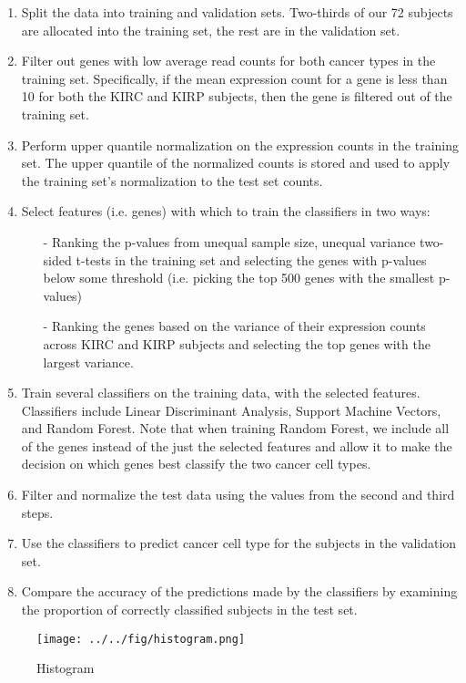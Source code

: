 \begin{enumerate}
\item Split the data into training and validation sets. Two-thirds of our 72 subjects are allocated into the training set,
the rest are in the validation set.
\item Filter out genes with low average read counts for both cancer types in the training set. Specifically, if the 
mean expression count for a gene is less than 10 for both the KIRC and KIRP subjects, then the gene is filtered out of the training
set.
\item Perform upper quantile normalization on the expression counts in the training set. The upper quantile of the normalized counts is stored and used to apply the training set's normalization to the test set counts.
\item Select features (i.e. genes) with which to train the classifiers in two ways:
\begin{itemize}
\item[-] Ranking the p-values from unequal sample size, unequal variance two-sided t-tests in the training set and selecting the genes with p-values below some threshold (i.e. picking the top 500 genes with the smallest p-values)
\item[-] Ranking the genes based on the variance of their expression counts across KIRC and KIRP subjects and selecting the
top genes with the largest variance.
\end{itemize}
\item Train several classifiers on the training data, with the selected features. Classifiers include Linear Discriminant Analysis, Support Machine Vectors, and Random Forest. Note that when training Random Forest, we include all of the genes instead of the just the selected features and allow it to make the decision on which genes best classify the two cancer cell types.
\item Filter and normalize the test data using the values from the second and third steps. 
\item Use the classifiers to predict cancer cell type for the subjects in the validation set.
\item Compare the accuracy of the predictions made by the classifiers by examining the proportion of correctly classified
subjects in the test set.
\end{enumerate}

\begin{figure}[H]
  \centering
    \texttt{[image: ../../fig/histogram.png]}
\caption{Histogram }
   \label{fig:histogram}
\end{figure}

